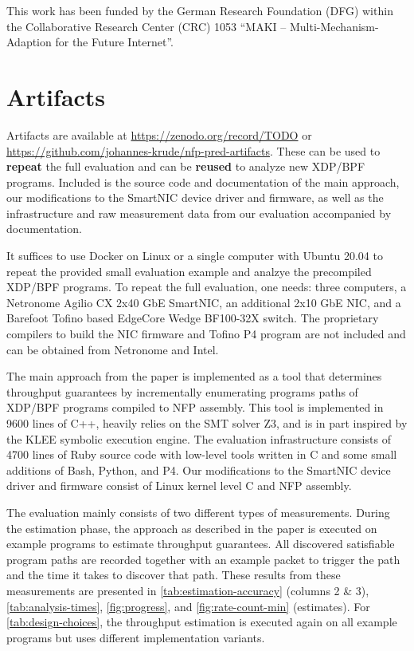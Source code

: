 \documentclass[10pt,letterpaper,sigconf,anonymous,nonacm,screen]{acmart}
\newcommand{\afblock}[1]{\noindent{\textbf{#1.}}}
\begin{document}
\begin{acks}
This work has been funded by the German Research Foundation (DFG) within the Collaborative Research Center (CRC) 1053 ``MAKI -- Multi-Mechanism-Adaption for the Future Internet''.
\end{acks}





\appendix

\section{Artifacts}

Artifacts are available at \url{https://zenodo.org/record/TODO} or \url{https://github.com/johannes-krude/nfp-pred-artifacts}.
These can be used to \textbf{repeat} the full evaluation and can be \textbf{reused} to analyze new XDP/BPF programs.
Included is the source code and documentation of the main approach, our modifications to the SmartNIC device driver and firmware, as well as the infrastructure and raw measurement data from our evaluation accompanied by documentation.

\afblock{Requirements}
It suffices to use Docker on Linux or a single computer with Ubuntu 20.04 to repeat the provided small evaluation example and analzye the precompiled XDP/BPF programs.
To repeat the full evaluation, one needs: three computers, a Netronome Agilio CX 2x40 GbE SmartNIC, an additional 2x10 GbE NIC, and a Barefoot Tofino based EdgeCore Wedge BF100-32X switch.
The proprietary compilers to build the NIC firmware and Tofino P4 program are not included and can be obtained from Netronome and Intel.

\afblock{Implementation}
The main approach from the paper is implemented as a tool that determines throughput guarantees by incrementally enumerating programs paths of XDP/BPF programs compiled to \acl{NFP} assembly.
This tool is implemented in 9600 lines of C++, heavily relies on the \ac{SMT} solver Z3, and is in part inspired by the KLEE symbolic execution engine.
The evaluation infrastructure consists of 4700 lines of Ruby source code with low-level tools written in C and some small additions of Bash, Python, and P4.
Our modifications to the SmartNIC device driver and firmware consist of Linux kernel level C and \ac{NFP} assembly.

\afblock{Measurements}
The evaluation mainly consists of two different types of measurements.
During the estimation phase, the approach as described in the paper is executed on example programs to estimate throughput guarantees.
All discovered satisfiable program paths are recorded together with an example packet to trigger the path and the time it takes to discover that path.
These results from these measurements are presented in \ref{tab:estimation-accuracy} (columns 2 \& 3), \ref{tab:analysis-times}, \ref{fig:progress}, and \ref{fig:rate-count-min} (estimates).
For \ref{tab:design-choices}, the throughput estimation is executed again on all example programs but uses different implementation variants.
\end{document}

